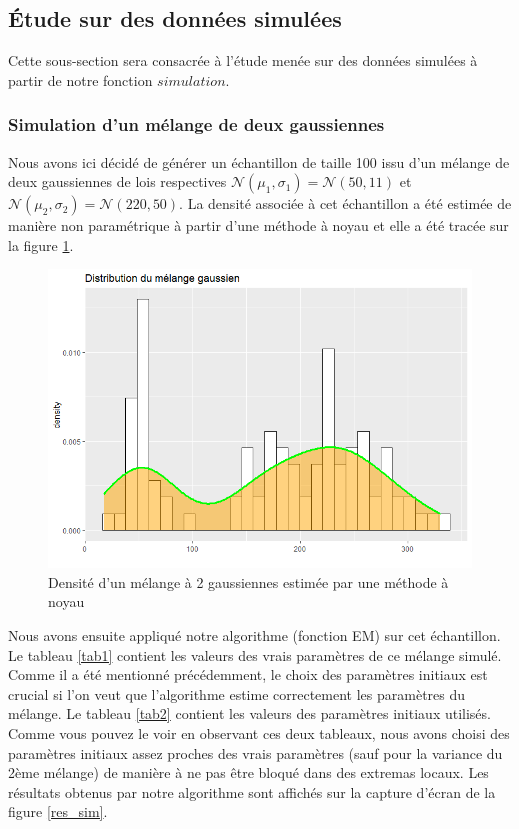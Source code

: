 \documentclass[a4paper,french,10pt]{article}
\begin{document}
\newpage

\subsection{Étude sur des données simulées}
Cette sous-section sera consacrée à l'étude menée sur des données simulées à partir de notre fonction $simulation$.

\subsubsection{Simulation d'un mélange de deux gaussiennes } 
Nous avons ici décidé de générer un échantillon de taille 100 issu d'un mélange de deux gaussiennes de lois respectives $\mathcal{N}(\mu_1, \sigma_1) = \mathcal{N}(50, 11)$ et $\mathcal{N}(\mu_2, \sigma_2) = \mathcal{N}(220, 50)$.
La densité associée à cet échantillon a été estimée de manière non paramétrique à partir d'une méthode à noyau et elle a été tracée sur la figure \ref{density_sim}.

\begin{figure}[htp] 
	\centering
	\includegraphics[scale=0.5]{images/dens_sim.png}
	\caption{Densité d'un mélange à 2 gaussiennes estimée par une méthode à noyau}
	\label{density_sim}
\end{figure}

Nous avons ensuite appliqué notre algorithme (fonction EM) sur cet échantillon. Le tableau \ref{tab1} contient les valeurs des vrais paramètres de ce mélange simulé. Comme il a été mentionné précédemment, le choix des paramètres initiaux est crucial si l'on veut que l'algorithme estime correctement les paramètres du mélange. Le tableau \ref{tab2} contient les valeurs des paramètres initiaux utilisés. Comme vous pouvez le voir en observant ces deux tableaux, nous avons choisi des paramètres initiaux assez proches des vrais paramètres (sauf pour la variance du 2ème mélange) de manière à ne pas être bloqué dans des extremas locaux. Les résultats obtenus par notre algorithme sont affichés sur la capture d'écran de la figure \ref{res_sim}.
\end{document}
